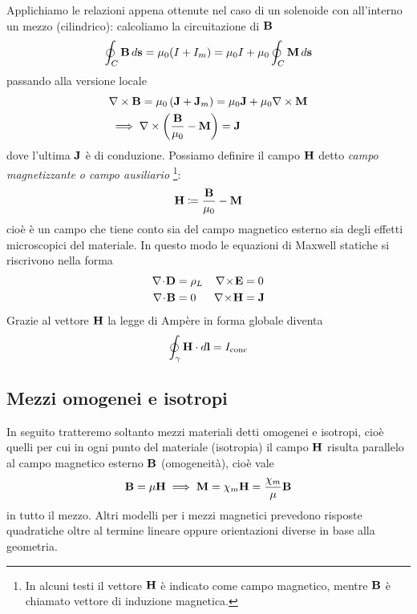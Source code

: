 Applichiamo le relazioni appena ottenute nel caso di un solenoide con all'interno un mezzo (cilindrico): calcoliamo la circuitazione di $ \mathbf{ B } $
\begin{equation}
  \oint_C \mathbf{ B }  \,d\mathbf{ s } = \mu_0(I + I_m) = \mu_0 I + \mu_0 \oint_C \mathbf{ M } \, d\mathbf{ s }
\end{equation}
passando alla versione locale
\begin{align}
  &\mathbf{\nabla}\times\mathbf{ B } = \mu_0\left( \mathbf{ J + J }_m \right) = \mu_0\mathbf{ J } + \mu_0\mathbf{\nabla}\times\mathbf{ M }
  \\
  &\implies \nabla \times \left( \frac{\mathbf{ B }}{\mu_0}-\mathbf{ M } \right) = \mathbf{ J } 
\end{align}
dove l'ultima $ \mathbf{ J } $ è di conduzione. Possiamo definire il campo $ \mathbf{ H } $ detto \textit{campo magnetizzante o campo ausiliario}\!
\footnote{In alcuni testi il vettore $ \mathbf{ H } $ è indicato come campo magnetico, mentre $ \mathbf{ B } $ è chiamato vettore di induzione magnetica.}: 
\begin{align}
  \mathbf{ H } \coloneqq \frac{\mathbf{ B }}{\mu_0} - \mathbf{ M }
\end{align}
cioè è un campo che tiene conto sia del campo magnetico esterno sia degli effetti microscopici del materiale. In questo modo le equazioni di Maxwell 
statiche si riscrivono nella forma
\begin{align}
  &&\nabla\!\cdot\!\v{ D } &= \rho_L & \nabla\!\times\!\v{ E } &= 0&&
  \\
  &&\nabla\!\cdot\!\v{ B } &= 0 & \nabla\!\times\!\v{ H } &= \v{ J }&&
\end{align}
Grazie al vettore $ \mathbf{ H } $ la legge di Ampère in forma globale diventa
\begin{align}
  \oint_\gamma \mathbf{ H } \cdot d\mathbf{ l } = I_{\text{conc}}
\end{align}

\subsection{Mezzi omogenei e isotropi}
In seguito tratteremo soltanto mezzi materiali detti omogenei e isotropi, cioè quelli per cui in ogni punto del materiale (isotropia) il campo 
$ \mathbf{ H } $ risulta parallelo al campo magnetico esterno $ \mathbf{ B } $ (omogeneità), cioè vale
\begin{align}
  \mathbf{ B } = \mu \mathbf{ H } \implies \mathbf{ M } = \chi_m \mathbf{ H } = \frac{\chi_m}{\mu} \mathbf{ B }
\end{align}
in tutto il mezzo. Altri modelli per i mezzi magnetici prevedono risposte quadratiche oltre al termine lineare oppure orientazioni diverse in base alla 
geometria.

